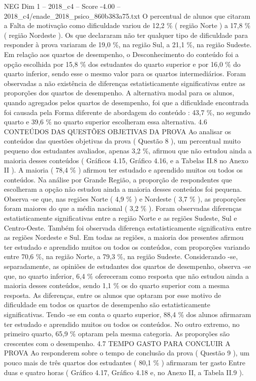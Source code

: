 \begin{textsample}{NEG Dim 1 – 2018\_c4 – Score -4.00 – 2018\_c4/enade\_2018\_psico\_860b383a75.txt}
O percentual de alunos que citaram a Falta de motivação como dificuldade variou de 12,2 \% ( região Norte ) a 17,8 \% ( região Nordeste ).
Os que declararam não ter qualquer tipo de dificuldade para responder à prova variaram de 19,0 \%, na região Sul, a 21,1 \%, na região Sudeste.
Em relação aos quartos de desempenho, o Desconhecimento do conteúdo foi a opção escolhida por 15,8 \% dos estudantes do quarto superior e por 16,0 \% do quarto inferior, sendo esse o mesmo valor para os quartos intermediários.
Foram observadas a não existência de diferenças estatisticamente significativas entre as proporções dos quartos de desempenho.
A alternativa modal para os alunos, quando agregados pelos quartos de desempenho, foi que a dificuldade encontrada foi causada pela Forma diferente de abordagem do conteúdo : 43,7 \%, no segundo quarto e 39,6 \% no quarto superior escolheram essa alternativa. 4.6 CONTEÚDOS DAS QUESTÕES OBJETIVAS DA PROVA Ao analisar os conteúdos das questões objetivas da prova ( Questão 8 ), um percentual muito pequeno dos estudantes avaliados, apenas 3,2 \%, afirmou que não estudou ainda a maioria desses conteúdos ( Gráficos 4.15, Gráfico 4.16, e a Tabelas II.8 no Anexo II ).
A maioria ( 78,4 \% ) afirmou ter estudado e aprendido muitos ou todos os conteúdos.
Na análise por Grande Região, a proporção de respondentes que escolheram a opção não estudou ainda a maioria desses conteúdos foi pequena.
Observa -se que, nas regiões Norte ( 4,9 \% ) e Nordeste ( 3,7 \% ), as proporções foram maiores do que a média nacional ( 3,2 \% ).
Foram observadas diferenças estatisticamente significativas entre a região Norte e as regiões Sudeste, Sul e Centro-Oeste.
Também foi observada diferença estatisticamente significativa entre as regiões Nordeste e Sul.
Em todas as regiões, a maioria dos presentes afirmou ter estudado e aprendido muitos ou todos os conteúdos, com proporções variando entre 70,6 \%, na região Norte, a 79,3 \%, na região Sudeste.
Considerando -se, separadamente, as opiniões de estudantes dos quartos de desempenho, observa -se que, no quarto inferior, 6,4 \% ofereceram como resposta que não estudou ainda a maioria desses conteúdos, sendo 1,1 \% os do quarto superior com a mesma resposta.
As diferenças, entre os alunos que optaram por esse motivo de dificuldade em todos os quartos de desempenho são estatisticamente significativas.
Tendo -se em conta o quarto superior, 88,4 \% dos alunos afirmaram ter estudado e aprendido muitos ou todos os conteúdos.
No outro extremo, no primeiro quarto, 65,9 \% optaram pela mesma categoria.
As proporções são crescentes com o desempenho. 4.7 TEMPO GASTO PARA CONCLUIR A PROVA Ao responderem sobre o tempo de conclusão da prova ( Questão 9 ), um pouco mais de três quartos dos estudantes ( 80,1 \% ) afirmaram ter gasto Entre duas e quatro horas ( Gráfico 4.17, Gráfico 4.18 e, no Anexo II, a Tabela II.9 ).

\end{textsample}

